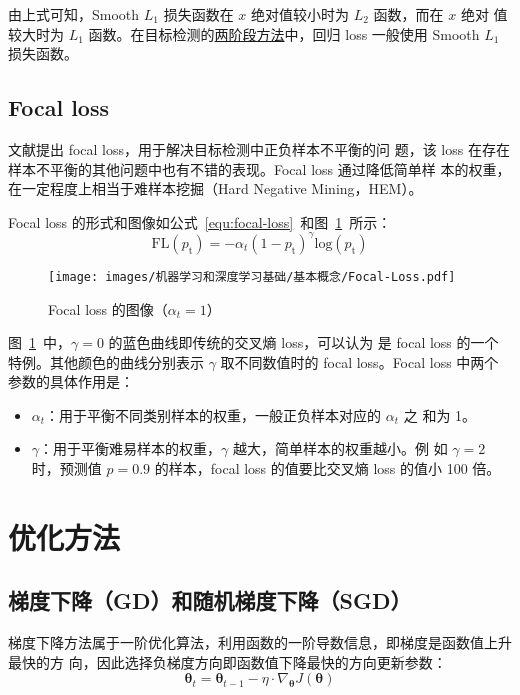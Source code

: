 由上式可知，Smooth $L_1$ 损失函数在 $x$ 绝对值较小时为 $L_2$ 函数，而在 $x$ 绝对
值较大时为 $L_1$ 函数。在目标检测的\hyperref[sec:R-CNN]{两阶段方法}中，回归 loss
一般使用 Smooth $L_1$ 损失函数。

\subsection{Focal loss}

文献提出 focal loss，用于解决目标检测中正负样本不平衡的问
题，该 loss 在存在样本不平衡的其他问题中也有不错的表现。Focal loss 通过降低简单样
本的权重，在一定程度上相当于难样本挖掘（Hard Negative Mining，HEM）。

Focal loss 的形式和图像如公式~\ref{equ:focal-loss}~和图~\ref{fig:focal-loss}~所示：
\begin{equation}
  \label{equ:focal-loss}
  \mathrm{FL}(p_{\mathrm{t}}) = - \alpha_t (1-p_{\mathrm{t}})^{\gamma} \mathrm{log}(p_{\mathrm{t}})
\end{equation}

\begin{figure}[ht]
  \centering
  \texttt{[image: images/机器学习和深度学习基础/基本概念/Focal-Loss.pdf]}
  \caption{Focal loss 的图像（$\alpha_t = 1$）}
  \label{fig:focal-loss}
\end{figure}

图~\ref{fig:focal-loss}~中，$\gamma = 0$ 的蓝色曲线即传统的交叉熵 loss，可以认为
是 focal loss 的一个特例。其他颜色的曲线分别表示 $\gamma$ 取不同数值时的 focal
loss。Focal loss 中两个参数的具体作用是：

\begin{itemize}
  \item $\alpha_t$：用于平衡不同类别样本的权重，一般正负样本对应的 $\alpha_t$ 之
    和为 1。
  \item $\gamma$：用于平衡难易样本的权重，$\gamma$ 越大，简单样本的权重越小。例
    如 $\gamma = 2$ 时，预测值 $p = 0.9$ 的样本，focal loss 的值要比交叉熵 loss
    的值小 100 倍。
\end{itemize}

\section{优化方法}
\label{sec:opt}

\subsection{梯度下降（GD）和随机梯度下降（SGD）}
梯度下降方法属于一阶优化算法，利用函数的一阶导数信息，即梯度是函数值上升最快的方
向，因此选择负梯度方向即函数值下降最快的方向更新参数：
\begin{equation}
  \boldsymbol{\theta}_t = \boldsymbol{\theta}_{t-1} - \eta \cdot \nabla_{\boldsymbol{\theta}}J(\boldsymbol{\theta})
\end{equation}

